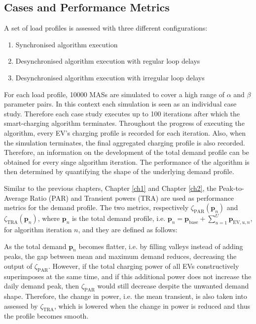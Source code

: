 \subsection{Cases and Performance Metrics}
\label{ch3:subsec:cases-and-metrics}

A set of load profiles is assessed with three different configurations:

\begin{enumerate}
	\item Synchronised algorithm execution
	\item Desynchronised algorithm execution with regular loop delays
	\item Desynchronised algorithm execution with irregular loop delays
\end{enumerate}

For each load profile, 10000 MASs are simulated to cover a high range of $\alpha$ and $\beta$ parameter pairs.
In this context each simulation is seen as an individual case study.
Therefore each case study executes up to 100 iterations after which the smart-charging algorithm terminates.
Throughout the progress of executing the algorithm, every EV's charging profile is recorded for each iteration.
Also, when the simulation terminates, the final aggregated charging profile is also recorded.
Therefore, an information on the development of the total demand profile can be obtained for every singe algorithm iteration.
The performance of the algorithm is then determined by quantifying the shape of the underlying demand profile.

Similar to the previous chapters, Chapter \ref{ch1} and Chapter \ref{ch2}, the Peak-to-Average Ratio (PAR) and Transient powers (TRA) are used as performance metrics for the demand profile.
The two metrics, respectively $\zeta_\text{PAR}(\textbf{p}_n)$ and $\zeta_\text{TRA}(\textbf{p}_n)$, where $\textbf{p}_n$ is the total demand profile, i.e. $\textbf{p}_n = \textbf{p}_\text{base} + \sum_{u=1}^U \textbf{p}_{\text{EV},u,n}$, for algorithm iteration $n$, and they are defined as follows:



As the total demand $\textbf{p}_n$ becomes flatter, i.e. by filling valleys instead of adding peaks, the gap between mean and maximum demand reduces, decreasing the output of $\zeta_\text{PAR}$.
However, if the total charging power of all EVs constructively superimposes at the same time, and if this additional power does not increase the daily demand peak, then $\zeta_\text{PAR}$ would still decrease despite the unwanted demand shape.
Therefore, the change in power, i.e. the mean transient, is also taken into assessed by $\zeta_\text{TRA}$, which is lowered when the change in power is reduced and thus the profile becomes smooth.

